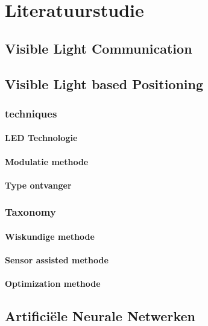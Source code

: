 \chapter{Literatuurstudie}
\section{Visible Light Communication}
\section{Visible Light based Positioning}
	\subsection{techniques}
		\subsubsection{LED Technologie}
		\subsubsection{Modulatie methode}
		\subsubsection{Type ontvanger}
	\subsection{Taxonomy}
		\subsubsection{Wiskundige methode}
		\subsubsection{Sensor assisted methode}
		\subsubsection{Optimization methode}
\section{Artificiële Neurale Netwerken}